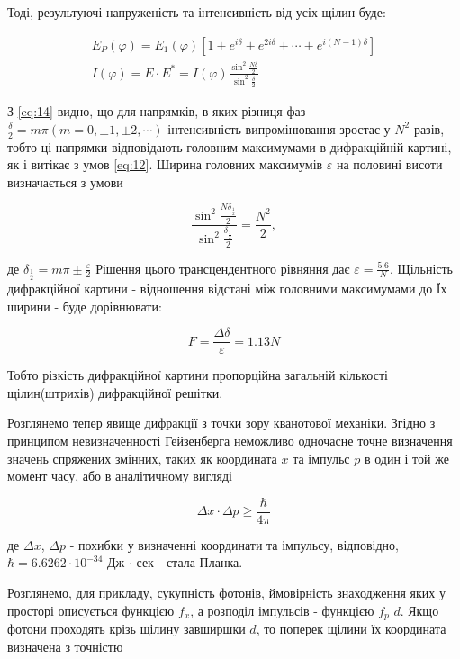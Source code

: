 Тоді, результуючі напруженість та інтенсивність від усіх щілин буде:

\begin{equation} \label{eq:14}
    \begin{gathered}
        E_P(\varphi) = E_1(\varphi) \left[ 1 + e^{i\delta} + e^{2 i\delta} + \cdots + e^{i (N-1) \delta} \right] \\
        I(\varphi) = E \cdot E^{*} = I(\varphi) \frac{\sin^2{\frac{N\delta}{2}}}{\sin^2{\frac{\delta}{2}}}
    \end{gathered}
\end{equation}


З \ref{eq:14} видно, що для напрямків, в яких різниця фаз
$\frac{\delta}{2} = m \pi (m = 0, \pm 1, \pm 2, \cdots)$
інтенсивність випромінювання зростає у $N^2$ разів, тобто
ці напрямки відповідають головним максимумами в дифракційній
картині, як і витікає з умов \ref{eq:12}. Ширина головних максимумів
$\varepsilon$ на половині висоти визначається з умови

$$ \dfrac{ \sin^2{\frac{N \delta_{\frac{1}{2}}}{2}} }
{\sin^2{\frac{\delta_{\frac{1}{2}}}{2}}} = \frac{N^2}{2}, $$ 

де $ \delta_{\frac{1}{2}} = m \pi \pm \frac{\varepsilon}{2} $
Рішення цього трансцендентного рівняння дає
$ \varepsilon = \frac{5.6}{N} $. Щільність дифракційної картини
- відношення відстані між головними максимумами до Їх
ширини - буде дорівнювати:

\begin{equation} \label{eq:15}
    F = \frac{\Delta \delta}{\varepsilon} = 1.13N
\end{equation}

Тобто різкість дифракційної картини пропорційна загальній
кількості щілин(штрихів) дифракційної решітки.


Розглянемо тепер явище дифракції з точки зору кванотової
механіки. Згідно з принципом невизначенності Гейзенберга
неможливо одночасне точне визначення значень спряжених змінних,
таких як координата $x$ та імпульс $p$ в один і той же
момент часу, або в аналітичному вигляді

\begin{equation} \label{eq:16}
    \Delta x \cdot \Delta p \ge \frac{\hbar}{4 \pi}
\end{equation}

де $\Delta x$, $\Delta p$ - похибки у визначенні координати
та імпульсу, відповідно, $\hbar = 6.6262 \cdot 10^{-34}$ Дж $\cdot$ сек -
стала Планка.


Розглянемо, для прикладу, сукупність фотонів, ймовірність
знаходження яких у просторі описується функцією $f_x$, 
а розподіл імпульсів - функцією $f_p$ $d$. Якщо фотони
проходять крізь щілину завширшки $d$, то поперек щілини
їх координата визначена з точністю

